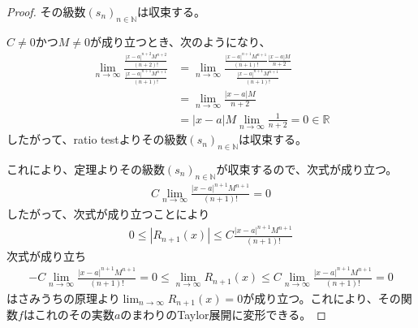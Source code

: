 \documentclass[dvipdfmx]{jsarticle}
\begin{document}
\begin{proof}
その級数$\left( s_{n} \right)_{n \in \mathbb{N}}$は収束する。\par
$C \neq 0$かつ$M \neq 0$が成り立つとき、次のようになり、
\begin{align*}
\lim_{n \rightarrow \infty}\frac{\frac{|x - a|^{n + 2}M^{n + 2}}{(n + 2)!}}{\frac{|x - a|^{n + 1}M^{n + 1}}{(n + 1)!}} &= \lim_{n \rightarrow \infty}\frac{\frac{|x - a|^{n + 1}M^{n + 1}}{(n + 1)!}\frac{|x - a|M}{n + 2}}{\frac{|x - a|^{n + 1}M^{n + 1}}{(n + 1)!}}\\
&= \lim_{n \rightarrow \infty}\frac{|x - a|M}{n + 2}\\
&= |x - a|M\lim_{n \rightarrow \infty}\frac{1}{n + 2} = 0 \in \mathbb{R}
\end{align*}
したがって、ratio testよりその級数$\left( s_{n} \right)_{n \in \mathbb{N}}$は収束する。\par
これにより、定理よりその級数$\left( s_{n} \right)_{n \in \mathbb{N}}$が収束するので、次式が成り立つ。
\begin{align*}
C\lim_{n \rightarrow \infty}\frac{|x - a|^{n + 1}M^{n + 1}}{(n + 1)!} = 0
\end{align*}
したがって、次式が成り立つことにより
\begin{align*}
0 \leq \left| R_{n + 1}(x) \right| \leq C\frac{|x - a|^{n + 1}M^{n + 1}}{(n + 1)!}
\end{align*}
次式が成り立ち
\begin{align*}
- C\lim_{n \rightarrow \infty}\frac{|x - a|^{n + 1}M^{n + 1}}{(n + 1)!} = 0 \leq \lim_{n \rightarrow \infty}{R_{n + 1}(x)} \leq C\lim_{n \rightarrow \infty}\frac{|x - a|^{n + 1}M^{n + 1}}{(n + 1)!} = 0
\end{align*}
はさみうちの原理より$\lim_{n \rightarrow \infty}{R_{n + 1}(x)} = 0$が成り立つ。これにより、その関数$f$はこれのその実数$a$のまわりのTaylor展開に変形できる。
\end{proof}
\end{document}

